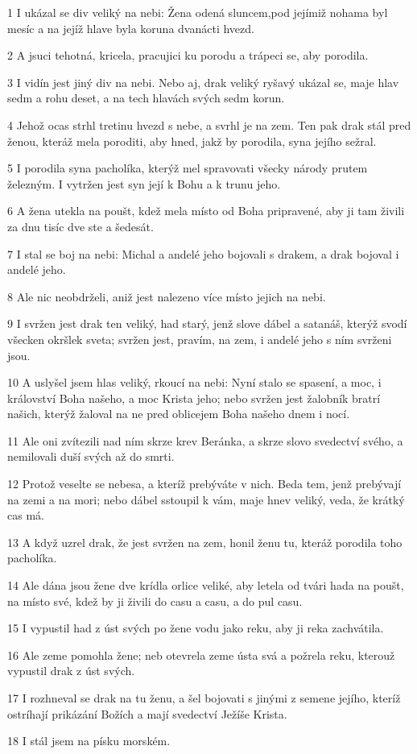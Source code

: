 \par 1 I ukázal se div veliký na nebi: Žena odená sluncem,pod jejímiž nohama byl mesíc a na jejíž hlave byla koruna dvanácti hvezd.
\par 2 A jsuci tehotná, kricela, pracujici ku porodu a trápeci se, aby porodila.
\par 3 I vidín jest jiný div na nebi. Nebo aj, drak veliký ryšavý ukázal se, maje hlav sedm a rohu deset, a na tech hlavách svých sedm korun.
\par 4 Jehož ocas strhl tretinu hvezd s nebe, a svrhl je na zem. Ten pak drak stál pred ženou, kteráž mela poroditi, aby hned, jakž by porodila, syna jejího sežral.
\par 5 I porodila syna pacholíka, kterýž mel spravovati všecky národy prutem železným. I vytržen jest syn její k Bohu a k trunu jeho.
\par 6 A žena utekla na poušt, kdež mela místo od Boha pripravené, aby ji tam živili za dnu tisíc dve ste a šedesát.
\par 7 I stal se boj na nebi: Michal a andelé jeho bojovali s drakem, a drak bojoval i andelé jeho.
\par 8 Ale nic neobdrželi, aniž jest nalezeno více místo jejich na nebi.
\par 9 I svržen jest drak ten veliký, had starý, jenž slove dábel a satanáš, kterýž svodí všecken okršlek sveta; svržen jest, pravím, na zem, i andelé jeho s ním svrženi jsou.
\par 10 A uslyšel jsem hlas veliký, rkoucí na nebi: Nyní stalo se spasení, a moc, i království Boha našeho, a moc Krista jeho; nebo svržen jest žalobník bratrí našich, kterýž žaloval na ne pred oblicejem Boha našeho dnem i nocí.
\par 11 Ale oni zvítezili nad ním skrze krev Beránka, a skrze slovo svedectví svého, a nemilovali duší svých až do smrti.
\par 12 Protož veselte se nebesa, a kteríž prebýváte v nich. Beda tem, jenž prebývají na zemi a na mori; nebo dábel sstoupil k vám, maje hnev veliký, veda, že krátký cas má.
\par 13 A když uzrel drak, že jest svržen na zem, honil ženu tu, kteráž porodila toho pacholíka.
\par 14 Ale dána jsou žene dve krídla orlice veliké, aby letela od tvári hada na poušt, na místo své, kdež by ji živili do casu a casu, a do pul casu.
\par 15 I vypustil had z úst svých po žene vodu jako reku, aby ji reka zachvátila.
\par 16 Ale zeme pomohla žene; neb otevrela zeme ústa svá a požrela reku, kterouž vypustil drak z úst svých.
\par 17 I rozhneval se drak na tu ženu, a šel bojovati s jinými z semene jejího, kteríž ostríhají prikázání Božích a mají svedectví Ježíše Krista.
\par 18 I stál jsem na písku morském.

